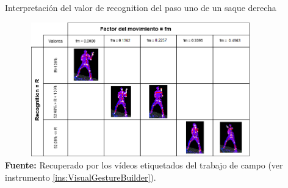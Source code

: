 \begin{table}[H]
	\caption{Interpretaci\'on del valor de recognition del paso uno de un saque derecha}
	\label{fig:recognitionSaque}
	\centering
	\includegraphics[width=445px,height=220px]{graphics/resultados/RecognitionTen.PNG} \\
	\textbf{Fuente:} Recuperado por los v\'ideos etiquetados del trabajo de campo (ver instrumento \ref{ins:VisualGestureBuilder}).
\end{table}
